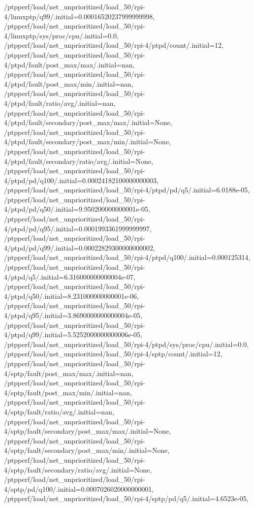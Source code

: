 {    /ptpperf/load/net_unprioritized/load_50/rpi-4/linuxptp/q99/.initial=0.00016520237999999998,
    /ptpperf/load/net_unprioritized/load_50/rpi-4/linuxptp/sys/proc/cpu/.initial=0.0,
    /ptpperf/load/net_unprioritized/load_50/rpi-4/ptpd/count/.initial=12,
    /ptpperf/load/net_unprioritized/load_50/rpi-4/ptpd/fault/post_max/max/.initial=nan,
    /ptpperf/load/net_unprioritized/load_50/rpi-4/ptpd/fault/post_max/min/.initial=nan,
    /ptpperf/load/net_unprioritized/load_50/rpi-4/ptpd/fault/ratio/avg/.initial=nan,
    /ptpperf/load/net_unprioritized/load_50/rpi-4/ptpd/fault/secondary/post_max/max/.initial=None,
    /ptpperf/load/net_unprioritized/load_50/rpi-4/ptpd/fault/secondary/post_max/min/.initial=None,
    /ptpperf/load/net_unprioritized/load_50/rpi-4/ptpd/fault/secondary/ratio/avg/.initial=None,
    /ptpperf/load/net_unprioritized/load_50/rpi-4/ptpd/pd/q100/.initial=0.00024182100000000003,
    /ptpperf/load/net_unprioritized/load_50/rpi-4/ptpd/pd/q5/.initial=6.0188e-05,
    /ptpperf/load/net_unprioritized/load_50/rpi-4/ptpd/pd/q50/.initial=9.950200000000001e-05,
    /ptpperf/load/net_unprioritized/load_50/rpi-4/ptpd/pd/q95/.initial=0.0001993361999999997,
    /ptpperf/load/net_unprioritized/load_50/rpi-4/ptpd/pd/q99/.initial=0.00022829300000000002,
    /ptpperf/load/net_unprioritized/load_50/rpi-4/ptpd/q100/.initial=0.000125314,
    /ptpperf/load/net_unprioritized/load_50/rpi-4/ptpd/q5/.initial=6.316000000000004e-07,
    /ptpperf/load/net_unprioritized/load_50/rpi-4/ptpd/q50/.initial=8.231000000000001e-06,
    /ptpperf/load/net_unprioritized/load_50/rpi-4/ptpd/q95/.initial=3.8690000000000004e-05,
    /ptpperf/load/net_unprioritized/load_50/rpi-4/ptpd/q99/.initial=5.5252000000000006e-05,
    /ptpperf/load/net_unprioritized/load_50/rpi-4/ptpd/sys/proc/cpu/.initial=0.0,
    /ptpperf/load/net_unprioritized/load_50/rpi-4/sptp/count/.initial=12,
    /ptpperf/load/net_unprioritized/load_50/rpi-4/sptp/fault/post_max/max/.initial=nan,
    /ptpperf/load/net_unprioritized/load_50/rpi-4/sptp/fault/post_max/min/.initial=nan,
    /ptpperf/load/net_unprioritized/load_50/rpi-4/sptp/fault/ratio/avg/.initial=nan,
    /ptpperf/load/net_unprioritized/load_50/rpi-4/sptp/fault/secondary/post_max/max/.initial=None,
    /ptpperf/load/net_unprioritized/load_50/rpi-4/sptp/fault/secondary/post_max/min/.initial=None,
    /ptpperf/load/net_unprioritized/load_50/rpi-4/sptp/fault/secondary/ratio/avg/.initial=None,
    /ptpperf/load/net_unprioritized/load_50/rpi-4/sptp/pd/q100/.initial=0.0007026020000000001,
    /ptpperf/load/net_unprioritized/load_50/rpi-4/sptp/pd/q5/.initial=4.6523e-05,
}
